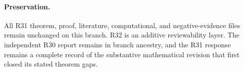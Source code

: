 \paragraph{Preservation.}
All R31 theorem, proof, literature, computational, and negative-evidence files remain unchanged on this branch. R32 is an additive reviewability layer. The independent R30 report remains in branch ancestry, and the R31 response remains a complete record of the substantive mathematical revision that first closed its stated theorem gaps.

